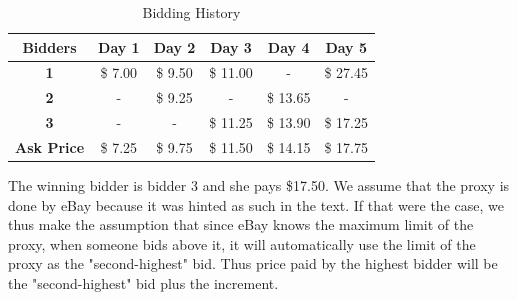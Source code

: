 \documentclass[]{article}
\begin{document}
\begin{table}[htbp]
	\centering
	\caption{Bidding History}
	\begin{tabular}{c|ccccc}
		\rowcolor[rgb]{ 0,  0,  0} \textcolor[rgb]{ 1,  1,  1}{\textbf{Bidders}} & \textcolor[rgb]{ 1,  1,  1}{\textbf{Day 1}} & \textcolor[rgb]{ 1,  1,  1}{\textbf{Day 2}} & \textcolor[rgb]{ 1,  1,  1}{\textbf{Day 3}} & \textcolor[rgb]{ 1,  1,  1}{\textbf{Day 4}} & \textcolor[rgb]{ 1,  1,  1}{\textbf{Day 5}} \\
		\midrule
		\rowcolor[rgb]{ .184,  .459,  .71} \textcolor[rgb]{ 1,  1,  1}{\textbf{1}} & \textcolor[rgb]{ 1,  1,  1}{ \$        7.00 } & \textcolor[rgb]{ 1,  1,  1}{ \$        9.50 } & \textcolor[rgb]{ 1,  1,  1}{ \$     11.00 } & \textcolor[rgb]{ 1,  1,  1}{ - } & \textcolor[rgb]{ 1,  1,  1}{ \$     27.45 } \\
		\rowcolor[rgb]{ .184,  .459,  .71} \textcolor[rgb]{ 1,  1,  1}{\textbf{2}} & \cellcolor[rgb]{ .357,  .608,  .835} \textcolor[rgb]{ 1,  1,  1}{ - } & \textcolor[rgb]{ 1,  1,  1}{ \$        9.25 } & \cellcolor[rgb]{ .357,  .608,  .835} \textcolor[rgb]{ 1,  1,  1}{ - } & \textcolor[rgb]{ 1,  1,  1}{ \$     13.65 } & \cellcolor[rgb]{ .357,  .608,  .835} \textcolor[rgb]{ 1,  1,  1}{ - } \\
		\rowcolor[rgb]{ .184,  .459,  .71} \textcolor[rgb]{ 1,  1,  1}{\textbf{3}} & \textcolor[rgb]{ 1,  1,  1}{ - } & \textcolor[rgb]{ 1,  1,  1}{ - } & \textcolor[rgb]{ 1,  1,  1}{ \$     11.25 } & \textcolor[rgb]{ 1,  1,  1}{ \$     13.90 } & \textcolor[rgb]{ 1,  1,  1}{ \$     17.25 } \\
		\rowcolor[rgb]{ .184,  .459,  .71} \textcolor[rgb]{ 1,  1,  1}{\textbf{Ask Price}} & \cellcolor[rgb]{ .357,  .608,  .835} \textcolor[rgb]{ 1,  1,  1}{ \$        7.25 } & \textcolor[rgb]{ 1,  1,  1}{ \$        9.75 } & \cellcolor[rgb]{ .357,  .608,  .835} \textcolor[rgb]{ 1,  1,  1}{ \$     11.50 } & \textcolor[rgb]{ 1,  1,  1}{ \$     14.15 } & \cellcolor[rgb]{ .357,  .608,  .835} \textcolor[rgb]{ 1,  1,  1}{ \$     17.75 } \\
	\end{tabular}
	\label{Q2.1 Bidding History}
\end{table}

The winning bidder is bidder 3 and she pays \$17.50. We assume that the proxy is done by eBay because it was hinted as such in the text. If that were the case, we thus make the assumption that since eBay knows the maximum limit of the proxy, when someone bids above it, it will automatically use the limit of the proxy as the "second-highest" bid. Thus price paid by the highest bidder will be the "second-highest" bid plus the increment.
\end{document}
